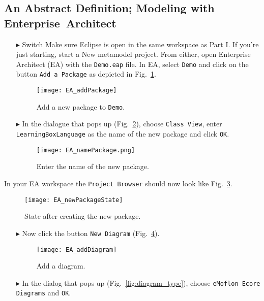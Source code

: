 \visHeader
\subsection[An Abstract Definition (Visual)]{An Abstract Definition; Modeling with \mbox{Enterprise Architect}}
\label{sec:staticAbstract}

\begin{enumerate}
\item[$\blacktriangleright$] \hypertarget{static vis}{Switch} Make sure Eclipse is open in the same workspace as Part I. If you're just starting, start a New metamodel project. From either, open Enterprise Architect (EA) with the \texttt{Demo.eap} file. In EA, select \texttt{Demo} and click on the button \texttt{Add a Package} as depicted in Fig.~\ref{fig:new_package}.

\begin{figure}[htbp]
	\centering
  \texttt{[image: EA\_addPackage]}
	\caption{Add a new package to \texttt{Demo}.}
	\label{fig:new_package}
\end{figure}

\item[$\blacktriangleright$] In the dialogue that pops up (Fig.~\ref{fig:new_package_name}), choose \texttt{Class View}, enter \texttt{Learning\-Box\-Language} as the name of the new package and click \texttt{OK}.

\begin{figure}[htbp]
	\centering
    \texttt{[image: EA\_namePackage.png]}
	\caption{Enter the name of the new package.}
	\label{fig:new_package_name}
\end{figure}
\end{enumerate}
\FloatBarrier

In your EA workspace the \texttt{Project Browser} should now look like Fig.~\ref{fig:new_package_completed}.
\begin{figure}[htbp]
	\centering
  \texttt{[image: EA\_newPackageState]}
	\caption{State after creating the new package.}
	\label{fig:new_package_completed}
\end{figure}
\FloatBarrier

\vspace{1cm}

\begin{enumerate}
\item[$\blacktriangleright$] Now click the button \texttt{New Diagram} (Fig.~\ref{fig:diagram}).
\vspace{0.5cm}

\begin{figure}[htbp]
	\centering
  \texttt{[image: EA\_addDiagram]}
	\caption{Add a diagram.}
	\label{fig:diagram}
\end{figure}
\FloatBarrier

\vspace{1cm}

\item[$\blacktriangleright$] In the dialog that pops up (Fig.~\ref{fig:diagram_type}), choose \texttt{eMoflon Ecore Diagrams} and \texttt{OK}.
\end{enumerate}

